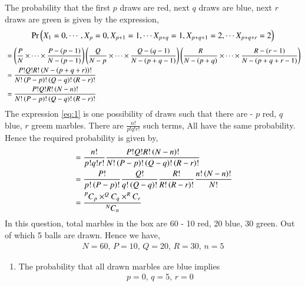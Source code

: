 \documentclass[journal,12pt,twocolumn]{IEEEtran}
\begin{document}
\begin{enumerate}
The probability that the first $p$ draws are red, next $q$ draws are blue, next $r$ draws are green is given by the expression,
\begin{align}
\Pr\left(X_1 = 0, \cdots, X_p = 0, X_{p+1} = 1, \cdots X_{p+q} = 1, X_{p+q+1} = 2, \cdots X_{p+q+r} = 2\right)
\end{align}
\begin{align}
&= \left(\frac{P}{N}\times \cdots \times \frac{P-\left(p-1\right)}{N-\left(p-1\right)}\right)\left(\frac{Q}{N-p}\times \cdots \times \frac{Q-\left(q-1\right)}{N-\left(p+q-1\right)}\right) \left(\frac{R}{N-\left(p+q\right)} \times \cdots \times \frac{R-\left(r-1\right)}{N-\left(p+q+r-1\right)}\right)\\
&= \frac{P! Q! R! \left(N-\left(p+q+r\right)\right)!}{N!\left(P-p\right)!\left(Q-q\right)!\left(R-r\right)!} \\
&= \frac{P! Q! R! \left(N-n\right)!}{N!\left(P-p\right)!\left(Q-q\right)!\left(R-r\right)!} \label{eq:1}
\end{align}
The expression \ref{eq:1} is one possibility of draws such that there are - $p$ red, $q$ blue, $r$ greem marbles. There are $\frac{n!}{p!q!r!}$ such terms, All have the same probability. Hence the required probability is given by, 
\begin{align}
&= \frac{n!}{p!q!r!} \frac{P! Q! R! \left(N-n\right)!}{N!\left(P-p\right)!\left(Q-q\right)!\left(R-r\right)!}\\
&= \frac{P!}{p!\left(P-p\right)!}\frac{Q!}{q!\left(Q-q\right)!}\frac{R!}{R!\left(R-r\right)!}\frac{n!\left(N-n\right)!}{N!}\\
&= \frac{^{P}C_{p} \times ^{Q}C_{q} \times ^{R}C_{r}}{^{N}C_{n}}
\label{eq:2}
\end{align}
\newpage
In this question, total marbles in the box are 60 - 10 red, 20 blue, 30 green. Out of which 5 balls are drawn. Hence we have,
\begin{align}
N = 60, \, P = 10, \,Q = 20,  \, R = 30, \,n = 5
\end{align}
\begin{enumerate}
\item The probability that all drawn marbles are blue implies
\begin{align}
p = 0,\,  q = 5, \, r = 0
\end{align}

\end{enumerate}
\end{enumerate}
\end{document}
